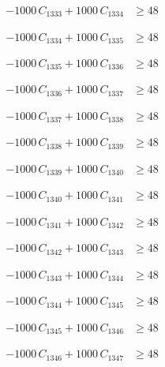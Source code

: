 \documentclass[a4paper,11pt]{article}
\begin{document}
\begin{align}
-1000\,C_{1333} + 1000\,C_{1334} &\geq 48 \nonumber
\end{align}

\begin{align}
-1000\,C_{1334} + 1000\,C_{1335} &\geq 48 \nonumber
\end{align}

\begin{align}
-1000\,C_{1335} + 1000\,C_{1336} &\geq 48 \nonumber
\end{align}

\begin{align}
-1000\,C_{1336} + 1000\,C_{1337} &\geq 48 \nonumber
\end{align}

\begin{align}
-1000\,C_{1337} + 1000\,C_{1338} &\geq 48 \nonumber
\end{align}

\begin{align}
-1000\,C_{1338} + 1000\,C_{1339} &\geq 48 \nonumber
\end{align}

\begin{align}
-1000\,C_{1339} + 1000\,C_{1340} &\geq 48 \nonumber
\end{align}

\begin{align}
-1000\,C_{1340} + 1000\,C_{1341} &\geq 48 \nonumber
\end{align}

\begin{align}
-1000\,C_{1341} + 1000\,C_{1342} &\geq 48 \nonumber
\end{align}

\begin{align}
-1000\,C_{1342} + 1000\,C_{1343} &\geq 48 \nonumber
\end{align}

\begin{align}
-1000\,C_{1343} + 1000\,C_{1344} &\geq 48 \nonumber
\end{align}

\begin{align}
-1000\,C_{1344} + 1000\,C_{1345} &\geq 48 \nonumber
\end{align}

\begin{align}
-1000\,C_{1345} + 1000\,C_{1346} &\geq 48 \nonumber
\end{align}

\begin{align}
-1000\,C_{1346} + 1000\,C_{1347} &\geq 48 \nonumber
\end{align}
\end{document}

